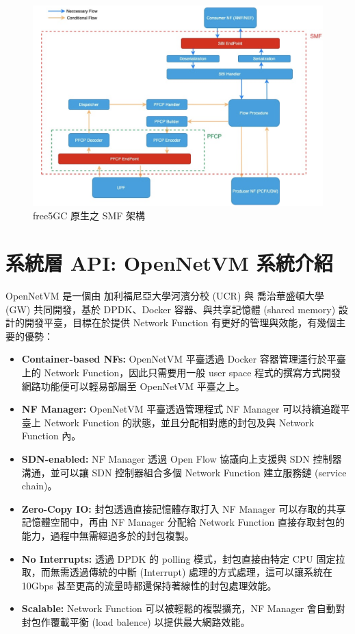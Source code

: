 \begin{figure}[htbp]
  \centering
  \includegraphics[height=!,width=1\linewidth,keepaspectratio=true]
                  {figures/free5gc_smf_arch}
  \caption[free5GC 原生之 SMF 架構]{{\footnotesize free5GC 原生之 SMF 架構}}
  \label{fig:free5gc_smf_arch}
\end{figure}

\section{系統層 API: OpenNetVM 系統介紹}
\label{sec:opennetvm_intro}

OpenNetVM 是一個由 加利福尼亞大學河濱分校 (UCR) 與 喬治華盛頓大學 (GW) 共同開發，基於 DPDK、Docker 容器、與共享記憶體 (shared memory) 設計的開發平臺，目標在於提供 Network Function 有更好的管理與效能，有幾個主要的優勢：

\begin{itemize}
\item \textbf{Container-based NFs:} OpenNetVM 平臺透過 Docker 容器管理運行於平臺上的 Network Function，因此只需要用一般 user space 程式的撰寫方式開發網路功能便可以輕易部屬至 OpenNetVM 平臺之上。
\item \textbf{NF Manager:} OpenNetVM 平臺透過管理程式 NF Manager 可以持續追蹤平臺上 Network Function 的狀態，並且分配相對應的封包及與 Network Function 內。
\item \textbf{SDN-enabled:} NF Manager 透過 Open Flow 協議向上支援與 SDN 控制器溝通，並可以讓 SDN 控制器組合多個 Network Function 建立服務鏈 (service chain)。
\item \textbf{Zero-Copy IO:} 封包透過直接記憶體存取打入 NF Manager 可以存取的共享記憶體空間中，再由 NF Manager 分配給 Network Function 直接存取封包的能力，過程中無需經過多於的封包複製。
\item \textbf{No Interrupts:} 透過 DPDK 的 polling 模式，封包直接由特定 CPU 固定拉取，而無需透過傳統的中斷 (Interrupt) 處理的方式處理，這可以讓系統在 10Gbps 甚至更高的流量時都還保持著線性的封包處理效能。
\item \textbf{Scalable:} Network Function 可以被輕鬆的複製擴充，NF Manager 會自動對封包作覆載平衡 (load balence) 以提供最大網路效能。
\end{itemize}


